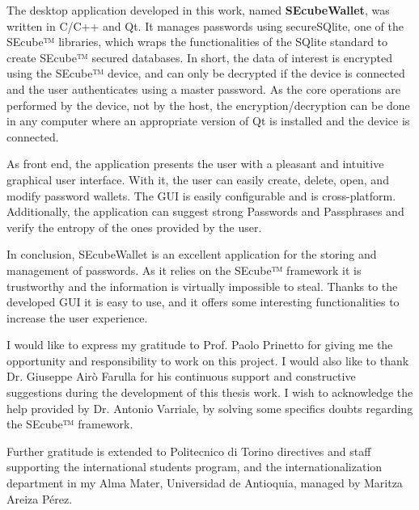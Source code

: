 \documentclass[%
    corpo=13pt,
    twoside,
    oldstyle,
    autoretitolo,
    greek,
    evenboxes,
    numerazioneromana,
    tipotesi=magistrale,
]{toptesi}
\begin{document}
The desktop application developed in this work, named \textbf{SEcubeWallet}, was written in C/C++ and Qt. 
It manages passwords using secureSQlite, one of the SEcube™ libraries, which wraps the functionalities of the SQlite standard to create SEcube™ secured databases. In short, the data of interest is encrypted using the SEcube™ device, and can only be decrypted if the device is connected and the user authenticates using a master password. 
As the core operations are performed by the device, not by the host, the encryption/decryption can be done in any computer where an appropriate version of Qt is installed and the device is connected.

As front end, the application presents the user with a pleasant and intuitive graphical user interface. With it, the user can easily create, delete, open, and modify password wallets. The GUI is easily configurable and is cross-platform.
Additionally, the application can suggest strong Passwords and Passphrases and verify the entropy of the ones provided by the user.

In conclusion, SEcubeWallet is an excellent application for the storing and management of passwords. As it relies on the SEcube™ framework it is trustworthy and the information is virtually impossible to steal. Thanks to the developed GUI it is easy to use, and it offers some interesting functionalities to increase the user experience.



\ringraziamenti
I would like to express my gratitude to Prof. Paolo Prinetto for giving me the opportunity and responsibility to work on this project. I would also like to thank Dr. Giuseppe Airò Farulla for his continuous support and constructive suggestions during the development of this thesis work. I wish to acknowledge the help provided by Dr. Antonio Varriale, by solving some specifics doubts regarding the SEcube™ framework. 

\vspace{7pt}

Further gratitude is extended to Politecnico di Torino directives and staff supporting the  international students program, and the internationalization department in my Alma Mater, Universidad de Antioquia, managed by \mbox{Maritza} Areiza Pérez.
\end{document}
